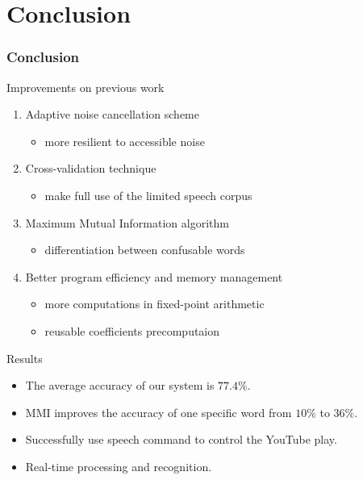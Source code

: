 \section{Conclusion}

\begin{frame}
\frametitle{Conclusion}

Improvements on previous work
\begin{enumerate}
	\item Adaptive noise cancellation scheme
	\begin{itemize}
		\item more resilient to accessible noise
	\end{itemize}
	\item Cross-validation technique
	\begin{itemize}
		\item make full use of the limited speech corpus
	\end{itemize}
	\item Maximum Mutual Information algorithm
	\begin{itemize}
		\item differentiation between confusable words
	\end{itemize}
	\item Better program efficiency and memory management
	\begin{itemize}
		\item more computations in fixed-point arithmetic
		\item reusable coefficients precomputaion
	\end{itemize}
\end{enumerate}
\end{frame}

\begin{frame}
\begin{block}{Results}
\begin{itemize}
	\item The average accuracy of our system is $77.4\%$.
	\item MMI improves the accuracy of one specific word from $10\%$ to $36\%$.
	\item Successfully use speech command to control the YouTube play.
	\item Real-time processing and recognition.
\end{itemize}
\end{block}
\end{frame}

